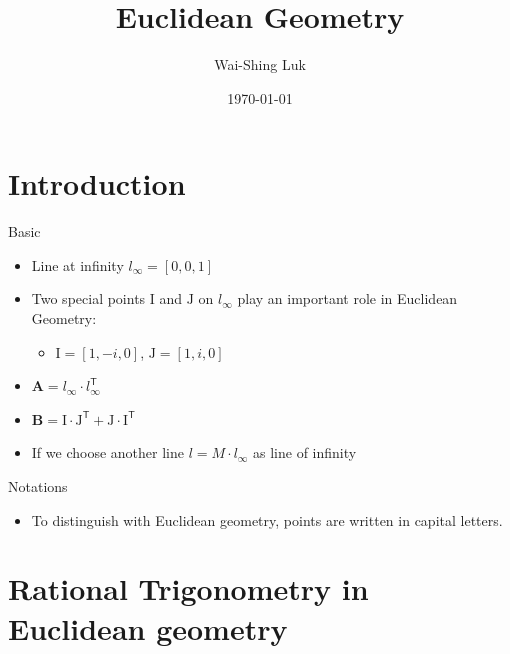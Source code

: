 \documentclass[10pt,ignorenonframetext,serif,onlymath]{beamer}
\title{Euclidean Geometry}
\author{Wai-Shing Luk}
\institute{Fudan University}
\date{\today}
\providecommand{\tightlist}{%
  \setlength{\itemsep}{0pt}\setlength{\parskip}{0pt}}
\begin{document}
\frame{\titlepage}

\begin{frame}
\tableofcontents[hideallsubsections]
\end{frame}
\hypertarget{sec:introduction}{%
\section{Introduction}\label{sec:introduction}}

\begin{frame}{Basic}
\protect\hypertarget{sec:basic}{}

\begin{itemize}
\item
  Line at infinity \(l_\infty = [0, 0, 1]\)
\item
  Two special points \(\mathrm{I}\) and \(\mathrm{J}\) on \(l_\infty\)
  play an important role in Euclidean Geometry:

  \begin{itemize}
  \tightlist
  \item
    \(\mathrm{I} = [1, -i, 0]\), \(\mathrm{J} = [1, i, 0]\)
  \end{itemize}
\item
  \(\mathbf{A} = l_\infty \cdot l_\infty^\mathsf{T}\)
\item
  \(\mathbf{B} = \mathrm{I} \cdot \mathrm{J}^\mathsf{T} + \mathrm{J} \cdot \mathrm{I}^\mathsf{T}\)
\item
  If we choose another line \(l = M \cdot l_\infty\) as line of infinity
\end{itemize}

\end{frame}

\begin{frame}{Notations}
\protect\hypertarget{sec:notations}{}

\begin{itemize}
\tightlist
\item
  To distinguish with Euclidean geometry, points are written in capital
  letters.
\end{itemize}

\end{frame}

\hypertarget{sec:rational-trigonometry-in-euclidean-geometry}{%
\section{Rational Trigonometry in Euclidean
geometry}\label{sec:rational-trigonometry-in-euclidean-geometry}}
\end{document}
